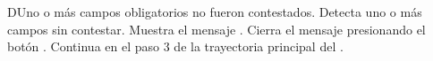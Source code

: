 
\begin{UCtrayectoriaA}{D}{Uno o más campos obligatorios no fueron contestados.}
	\UCpaso Detecta uno o más campos sin contestar.
    \UCpaso Muestra el mensaje .
    \UCpaso[\UCactor] Cierra el mensaje presionando el botón .
    \UCpaso Continua en el paso 3 de la trayectoria principal del .
\end{UCtrayectoriaA}

